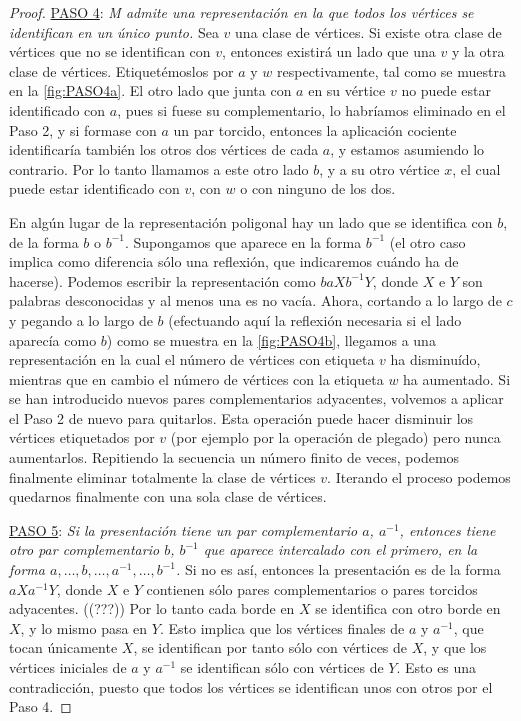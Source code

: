 \documentclass[10pt]{report}
\theoremstyle{definition}
\begin{document}
\begin{proof}
\underline{PASO 4}: \textit{M admite una representación en la que todos los vértices se identifican en un único punto.} Sea $v$ una clase de vértices. Si existe otra clase de vértices que no se identifican con $v$, entonces existirá un lado que una $v$ y la otra clase de vértices. Etiquetémoslos por $a$ y $w$ respectivamente, tal como se muestra en la \autoref{fig:PASO4a}. El otro lado que junta con $a$ en su vértice $v$ no puede estar identificado con $a$, pues si fuese su complementario, lo habríamos eliminado en el Paso 2, y si formase con $a$ un par torcido, entonces la aplicación cociente identificaría también los otros dos vértices de cada $a$, y estamos asumiendo lo contrario. Por lo tanto llamamos a este otro lado $b$, y a su otro vértice $x$, el cual puede estar identificado con $v$, con $w$ o con ninguno de los dos.

En algún lugar de la representación poligonal hay un lado que se identifica con $b$, de la forma $b$ o $b^{-1}$. Supongamos que aparece en la forma $b^{-1}$ (el otro caso implica como diferencia sólo una reflexión, que indicaremos cuándo ha de hacerse). Podemos escribir la representación como $baXb^{-1}Y$, donde $X$ e $Y$ son palabras desconocidas y al menos una es no vacía. Ahora, cortando a lo largo de $c$ y pegando a lo largo de $b$ (efectuando aquí la reflexión necesaria si el lado aparecía como $b$) como se muestra en la \autoref{fig:PASO4b}, llegamos a una representación en la cual el número de vértices con etiqueta $v$ ha disminuído, mientras que en cambio el número de vértices con la etiqueta $w$ ha aumentado. Si se han introducido nuevos pares complementarios adyacentes, volvemos a aplicar el Paso 2 de nuevo para quitarlos. Esta operación puede hacer disminuir los vértices etiquetados por $v$ (por ejemplo por la operación de plegado) pero nunca aumentarlos. Repitiendo la secuencia un número finito de veces, podemos finalmente eliminar totalmente la clase de vértices $v$. Iterando el proceso podemos quedarnos finalmente con una sola clase de vértices.

\underline{PASO 5}: \textit{Si la presentación tiene un par complementario $a$, $a^{-1}$, entonces tiene otro par complementario $b$,  $b^{-1}$ que aparece intercalado con el primero, en la forma $a,\dots , b, \dots ,a^{-1}, \dots , b^{-1} $.} Si no es así, entonces la presentación es de la forma $aXa^{-1}Y$, donde $X$ e $Y$ contienen sólo pares complementarios o pares torcidos adyacentes. ((???)) Por lo tanto cada borde en $X$ se identifica con otro borde en $X$, y lo mismo pasa en $Y$. Esto implica que los vértices finales de $a$ y $a^{-1}$, que tocan únicamente $X$, se identifican por tanto sólo con vértices de $X$, y que los vértices iniciales de $a$ y $a^{-1}$ se identifican sólo con vértices de $Y$. Esto es una contradicción, puesto que todos los vértices se identifican unos con otros por el Paso 4.


\end{proof}
\end{document}
